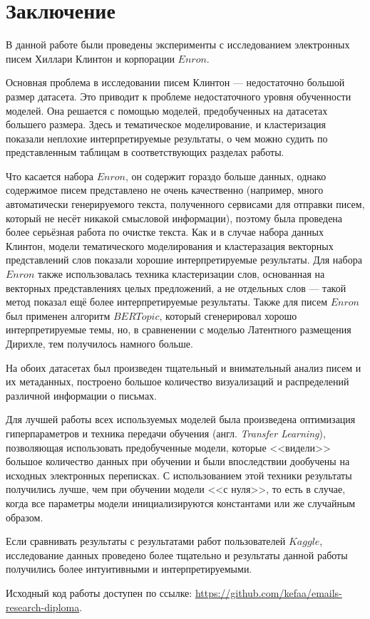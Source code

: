 \chapter*{Заключение}

В данной работе были проведены эксперименты с исследованием электронных писем Хиллари Клинтон и корпорации $Enron$. 

Основная проблема в исследовании писем Клинтон --- недостаточно большой размер датасета. Это приводит к проблеме недостаточного уровня обученности моделей. Она решается с помощью 
моделей, предобученных на датасетах большего размера. Здесь и тематическое моделирование, и кластеризация показали неплохие интерпретируемые результаты, о чем можно судить по представленным таблицам в соответствующих разделах работы.

Что касается набора $Enron$, он содержит гораздо больше данных, однако содержимое писем представлено не очень качественно (например, много автоматически генерируемого текста, полученного сервисами
для отправки писем, который не несёт никакой смысловой информации), поэтому была проведена более серьёзная работа по очистке текста. Как и в случае
набора данных Клинтон, модели тематического моделирования и кластеразация векторных 
представлений слов показали хорошие интерпретируемые результаты. Для набора $Enron$ также использовалась техника кластеризации слов, основанная на векторных представлениях целых предложений, а не отдельных слов --- такой метод показал ещё более интерпретируемые результаты. Также для писем $Enron$ был применен алгоритм $BERTopic$, который сгенерировал хорошо интерпретируемые темы, но, в сравненении с моделью Латентного размещения Дирихле, тем получилось намного больше.

На обоих датасетах был произведен тщательный и внимательный анализ писем и их метаданных, построено большое количество визуализаций и распределений различной информации о письмах.

Для лучшей работы всех используемых моделей была произведена оптимизация гиперпараметров и техника передачи обучения (англ. \textit{Transfer Learning}), позволяющая использовать предобученные модели, которые <<видели>> большое количество данных при обучении и были впоследствии дообучены на исходных электронных переписках. С использованием этой техники результаты получились лучше, чем при обучении модели <<с нуля>>, то есть в случае, когда все параметры модели инициализируются константами или же случайным образом.

Если сравнивать результаты с результатами работ пользователей $Kaggle$, исследование данных проведено более тщательно и результаты данной работы получились более интуитивными и интерпретируемыми.

Исходный код работы доступен по ссылке: \url{https://github.com/kefaa/emails-research-diploma}.

\clearpage
